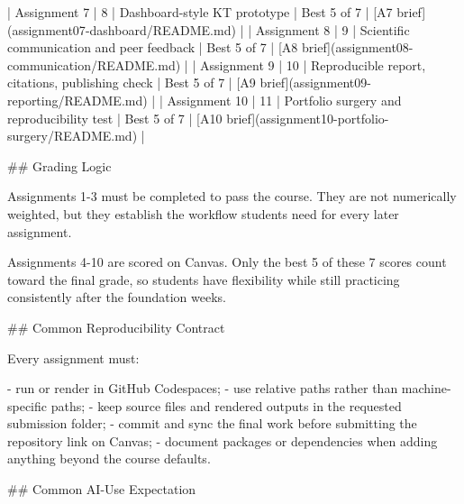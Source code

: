 \documentclass[
  letterpaper,
  DIV=11,
  numbers=noendperiod,
  oneside]{scrreprt}
\newenvironment{Shaded}{\begin{snugshade}}{\end{snugshade}}
\newcommand{\CommentTok}[1]{\textcolor[rgb]{0.37,0.37,0.37}{#1}}
\newcommand{\FunctionTok}[1]{\textcolor[rgb]{0.28,0.35,0.67}{#1}}
\newcommand{\NormalTok}[1]{\textcolor[rgb]{0.00,0.23,0.31}{#1}}
\newcommand{\OtherTok}[1]{\textcolor[rgb]{0.00,0.23,0.31}{#1}}
\newcommand{\PreprocessorTok}[1]{\textcolor[rgb]{0.68,0.00,0.00}{#1}}
\newcommand{\SpecialStringTok}[1]{\textcolor[rgb]{0.13,0.47,0.30}{#1}}
\begin{document}
\begin{Shaded}
\begin{Highlighting}[numbers=left,,]
\PreprocessorTok{|}\NormalTok{ Assignment 7 }\PreprocessorTok{|}\NormalTok{ 8 }\PreprocessorTok{|}\NormalTok{ Dashboard{-}style KT prototype }\PreprocessorTok{|}\NormalTok{ Best 5 of 7 }\PreprocessorTok{|} \CommentTok{[}\OtherTok{A7 brief}\CommentTok{](assignment07{-}dashboard/README.md)} \PreprocessorTok{|}
\PreprocessorTok{|}\NormalTok{ Assignment 8 }\PreprocessorTok{|}\NormalTok{ 9 }\PreprocessorTok{|}\NormalTok{ Scientific communication and peer feedback }\PreprocessorTok{|}\NormalTok{ Best 5 of 7 }\PreprocessorTok{|} \CommentTok{[}\OtherTok{A8 brief}\CommentTok{](assignment08{-}communication/README.md)} \PreprocessorTok{|}
\PreprocessorTok{|}\NormalTok{ Assignment 9 }\PreprocessorTok{|}\NormalTok{ 10 }\PreprocessorTok{|}\NormalTok{ Reproducible report, citations, publishing check }\PreprocessorTok{|}\NormalTok{ Best 5 of 7 }\PreprocessorTok{|} \CommentTok{[}\OtherTok{A9 brief}\CommentTok{](assignment09{-}reporting/README.md)} \PreprocessorTok{|}
\PreprocessorTok{|}\NormalTok{ Assignment 10 }\PreprocessorTok{|}\NormalTok{ 11 }\PreprocessorTok{|}\NormalTok{ Portfolio surgery and reproducibility test }\PreprocessorTok{|}\NormalTok{ Best 5 of 7 }\PreprocessorTok{|} \CommentTok{[}\OtherTok{A10 brief}\CommentTok{](assignment10{-}portfolio{-}surgery/README.md)} \PreprocessorTok{|}

\FunctionTok{\#\# Grading Logic}

\NormalTok{Assignments 1{-}3 must be completed to pass the course. They are not numerically weighted, but they establish the workflow students need for every later assignment.}

\NormalTok{Assignments 4{-}10 are scored on Canvas. Only the best 5 of these 7 scores count toward the final grade, so students have flexibility while still practicing consistently after the foundation weeks.}

\FunctionTok{\#\# Common Reproducibility Contract}

\NormalTok{Every assignment must:}

\SpecialStringTok{{-} }\NormalTok{run or render in GitHub Codespaces;}
\SpecialStringTok{{-} }\NormalTok{use relative paths rather than machine{-}specific paths;}
\SpecialStringTok{{-} }\NormalTok{keep source files and rendered outputs in the requested submission folder;}
\SpecialStringTok{{-} }\NormalTok{commit and sync the final work before submitting the repository link on Canvas;}
\SpecialStringTok{{-} }\NormalTok{document packages or dependencies when adding anything beyond the course defaults.}

\FunctionTok{\#\# Common AI{-}Use Expectation}


\end{Highlighting}
\end{Shaded}
\end{document}
